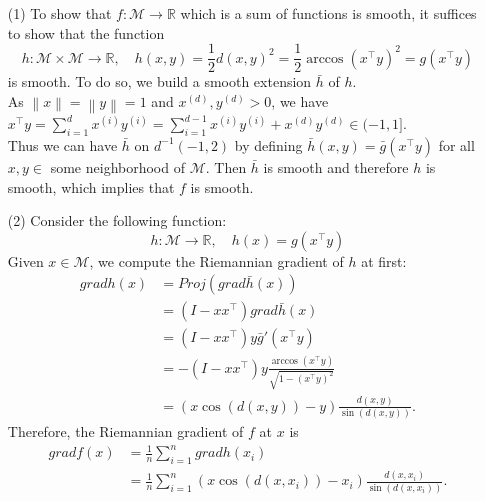 \documentclass[en, oneside]{assignment}
\begin{document}
\begin{sol}
    \begin{itemize}
        \item[(1)] To show that $f: \mathcal{M} \rightarrow \mathbb{R}$ which is a sum of functions is smooth, 
        it suffices to show that the function
        \begin{equation*}
            h: \mathcal{M} \times \mathcal{M} \rightarrow \mathbb{R}, \quad 
            h(x, y) = \frac{1}{2}d(x, y)^2 = \frac{1}{2}\arccos(x^{\top} y)^2 = g(x^{\top} y)
        \end{equation*}
        is smooth. To do so, we build a smooth extension $\bar{h}$ of $h$.\\
        As $\left\lVert x \right\rVert = \left\lVert y \right\rVert = 1$ and $x^{(d)}, y^{(d)} > 0$, we have
        $x^{\top} y = \sum_{i=1}^{d} x^{(i)}y^{(i)} = \sum_{i=1}^{d-1} x^{(i)}y^{(i)} + x^{(d)}y^{(d)} \in (-1, 1]$.\\
        Thus we can have $\bar{h}$ on $d^{-1} (-1, 2)$ by defining $\bar{h}(x, y) = \bar{g}(x^{\top} y)$ for all $x, y \in$ some neighborhood of $\mathcal{M}$.
        Then $\bar{h}$ is smooth and therefore $h$ is smooth, which implies that $f$ is smooth.
        \item[(2)] Consider the following function:
        \begin{equation*}
            h: \mathcal{M} \rightarrow \mathbb{R}, \quad h(x) = g(x^{\top} y)
        \end{equation*}
        Given $x \in \mathcal{M}$, we compute the Riemannian gradient of $h$ at first:
        \begin{align*}
            gradh(x) & = Proj(grad \bar{h}(x))\\
            & = (I - xx^{\top})grad \bar{h}(x)\\
            & = (I - xx^{\top}) y \bar{g}'(x^{\top} y)\\
            & = -(I - xx^{\top}) y \frac{\arccos(x^{\top} y)}{\sqrt{1 - (x^{\top} y)^2}}\\
            & = (x \cos(d(x, y)) - y) \frac{d(x, y)}{\sin(d(x, y))}.
        \end{align*}
        Therefore, the Riemannian gradient of $f$ at $x$ is
        \begin{align*}
            gradf(x) & = \frac{1}{n} \sum_{i=1}^{n} gradh(x_i)\\
            & = \frac{1}{n} \sum_{i=1}^{n} (x \cos(d(x, x_i)) - x_i) \frac{d(x, x_i)}{\sin(d(x, x_i))}.
        \end{align*}
    \end{itemize}
\end{sol}
\end{document}
